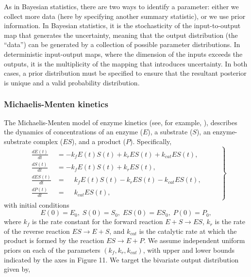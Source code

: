 \documentclass[10pt,letterpaper]{article}
\begin{document}
\vspace{0.5cm}

As in Bayesian statistics, there are two ways to identify a parameter: either we collect more data (here by specifying another summary statistic), or we use prior information. In Bayesian statistics, it is the stochasticity of the input-to-output map that generates the uncertainty, meaning that the output distribution (the ``data'') can be generated by a collection of possible parameter distributions. In deterministic input-output maps, where the dimension of the inputs exceeds the outputs, it is the multiplicity of the mapping that introduces uncertainty. In both cases, a prior distribution must be specified to ensure that the resultant posterior is unique and a valid probability distribution.


\subsubsection{Michaelis-Menten kinetics}\label{sec:MichaelisMenten}
The Michaelis-Menten model of enzyme kinetics (see, for example, \cite{murray2007mathematical}), describes the dynamics of concentrations of an enzyme ($E$), a substrate ($S$), an enzyme-substrate complex ($ES$), and a product ($P$). Specifically,
%
\begin{equation}
\left .
\begin{gathered}\begin{aligned}
\frac{dE(t)}{dt}  &= -k_f E(t)S(t) + k_r ES(t) + k_{cat} ES(t), \\
\frac{dS(t)}{dt}  &= -k_f E(t)S(t) + k_r ES(t), \\
\frac{dES(t)}{dt} &= \phantom{-}k_f E(t)S(t) - k_r ES(t) - k_{cat} ES(t), \\
\frac{dP(t)}{dt}  &= \phantom{-}k_{cat} ES(t),
\end{aligned}\end{gathered}
\qquad \right \}
\end{equation}
with initial conditions
\begin{equation}
E(0) = E_0, \; S(0)=S_0, \; ES(0)=ES_0, \; P(0)=P_0,
\end{equation}
%
where $k_f$ is the rate constant for the forward reaction $E+S\rightarrow ES$, $k_r$ is the rate of the reverse reaction $ES\rightarrow E+S$, and $k_{cat}$ is the catalytic rate at which the product is formed by the reaction $ES\rightarrow E + P$. We assume independent uniform priors on each of the parameters $(k_f,k_r,k_{cat})$, with upper and lower bounds indicated by the axes in Figure 11. We target the bivariate output distribution given by,
\end{document}
